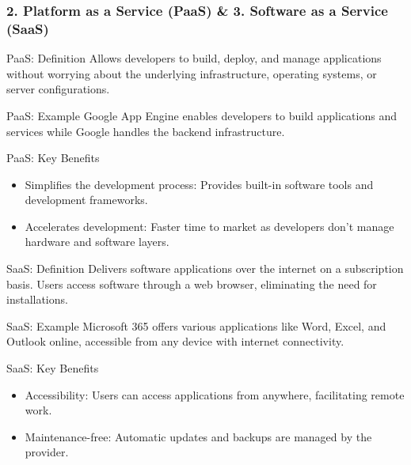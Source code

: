 \documentclass[aspectratio=169]{beamer}
\begin{document}
\begin{frame}[fragile]
    \frametitle{2. Platform as a Service (PaaS) \& 3. Software as a Service (SaaS)}
    
    \begin{block}{PaaS: Definition}
        Allows developers to build, deploy, and manage applications without worrying about the underlying infrastructure, operating systems, or server configurations.
    \end{block}
    
    \begin{block}{PaaS: Example}
        Google App Engine enables developers to build applications and services while Google handles the backend infrastructure.
    \end{block}
    
    \begin{block}{PaaS: Key Benefits}
        \begin{itemize}
            \item Simplifies the development process: Provides built-in software tools and development frameworks.
            \item Accelerates development: Faster time to market as developers don't manage hardware and software layers.
        \end{itemize}
    \end{block}
    
    \begin{block}{SaaS: Definition}
        Delivers software applications over the internet on a subscription basis. Users access software through a web browser, eliminating the need for installations.
    \end{block}
    
    \begin{block}{SaaS: Example}
        Microsoft 365 offers various applications like Word, Excel, and Outlook online, accessible from any device with internet connectivity.
    \end{block}
    
    \begin{block}{SaaS: Key Benefits}
        \begin{itemize}
            \item Accessibility: Users can access applications from anywhere, facilitating remote work.
            \item Maintenance-free: Automatic updates and backups are managed by the provider.
        \end{itemize}
    \end{block}
\end{frame}
\end{document}
